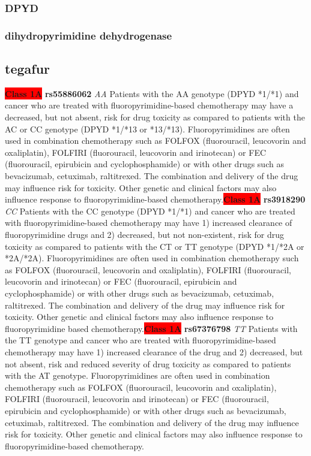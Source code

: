 \documentclass{book}
\begin{document}
\subsubsection{ DPYD }
\subsubsection{ dihydropyrimidine dehydrogenase }

\subsection{ tegafur }


\begin{center}
\textbf{\colorbox{red} {Class 1A}} \textbf{ rs55886062 } \textit{ AA }
Patients with the AA genotype (DPYD *1/*1) and cancer who are treated with fluoropyrimidine-based chemotherapy may have a decreased, but not absent, risk for drug toxicity as compared to patients with the AC or CC genotype (DPYD *1/*13 or *13/*13). Fluoropyrimidines are often used in combination chemotherapy such as FOLFOX (fluorouracil, leucovorin and oxaliplatin), FOLFIRI (fluorouracil, leucovorin and irinotecan) or FEC (fluorouracil, epirubicin and cyclophosphamide) or with other drugs such as bevacizumab, cetuximab, raltitrexed. The combination and delivery of the drug may influence risk for toxicity. Other genetic and clinical factors may also influence response to fluoropyrimidine-based chemotherapy.\textbf{\colorbox{red} {Class 1A}} \textbf{ rs3918290 } \textit{ CC }
Patients with the CC genotype (DPYD *1/*1) and cancer who are treated with fluoropyrimidine-based chemotherapy may have 1) increased clearance of fluoropyrimidine drugs and 2) decreased, but not non-existent, risk for drug toxicity as compared to patients with the CT or TT genotype (DPYD *1/*2A or *2A/*2A). Fluoropyrimidines are often used in combination chemotherapy such as FOLFOX (fluorouracil, leucovorin and oxaliplatin), FOLFIRI (fluorouracil,  leucovorin and irinotecan) or FEC (fluorouracil, epirubicin and cyclophosphamide) or with other drugs such as bevacizumab, cetuximab, raltitrexed. The combination and delivery of the drug may influence risk for toxicity. Other genetic and clinical factors may also influence response to fluoropyrimidine based chemotherapy.\textbf{\colorbox{red} {Class 1A}} \textbf{ rs67376798 } \textit{ TT }
Patients with the TT genotype and cancer who are treated with fluoropyrimidine-based chemotherapy may have 1) increased clearance of the drug and 2) decreased, but not absent, risk and reduced severity of drug toxicity as compared to patients with the AT genotype. Fluoropyrimidines are often used in combination chemotherapy such as FOLFOX (fluorouracil, leucovorin and oxaliplatin), FOLFIRI (fluorouracil, leucovorin and irinotecan) or FEC (fluorouracil, epirubicin and cyclophosphamide) or with other drugs such as bevacizumab, cetuximab, raltitrexed. The combination and delivery of the drug may influence risk for toxicity. Other genetic and clinical factors may also influence response to fluoropyrimidine-based chemotherapy.




\end{center}
\end{document}
